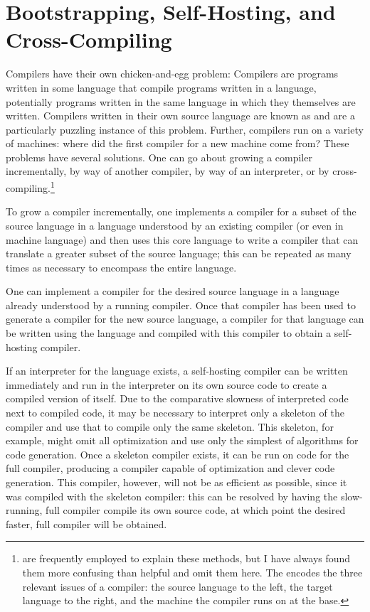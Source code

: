 \section{Bootstrapping, Self-Hosting, and Cross-Compiling}
Compilers have their own chicken-and-egg problem: Compilers are programs written in some language that compile programs written in a language, potentially programs written in the same language in which they themselves are written. Compilers written in their own source language are known as  and are a particularly puzzling instance of this problem. Further, compilers run on a variety of machines: where did the first compiler for a new machine come from? These problems have several solutions. One can go about growing a compiler incrementally, by way of another compiler, by way of an interpreter, or by cross-compiling.\footnote{ are frequently employed to explain these methods, but I have always found them more confusing than helpful and omit them here. The  encodes the three relevant issues of a compiler: the source language to the left, the target language to the right, and the machine the compiler runs on at the base.}

To grow a compiler incrementally, one implements a compiler for a subset of the source language in a language understood by an existing compiler (or even in machine language) and then uses this core language to write a compiler that can translate a greater subset of the source language; this can be repeated as many times as necessary to encompass the entire language.

One can implement a compiler for the desired source language in a language already understood by a running compiler. Once that compiler has been used to generate a compiler for the new source language, a compiler for that language can be written using the language and compiled with this compiler to obtain a self-hosting compiler.

If an interpreter for the language exists, a self-hosting compiler can be written immediately and run in the interpreter on its own source code to create a compiled version of itself. Due to the comparative slowness of interpreted code next to compiled code, it may be necessary to interpret only a skeleton of the compiler and use that to compile only the same skeleton. This skeleton, for example, might omit all optimization and use only the simplest of algorithms for code generation. Once a skeleton compiler exists, it can be run on code for the full compiler, producing a compiler capable of optimization and clever code generation. This compiler, however, will not be as efficient as possible, since it was compiled with the skeleton compiler: this can be resolved by having the slow-running, full compiler compile its own source code, at which point the desired faster, full compiler will be obtained.

